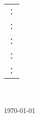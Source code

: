 \setcounter{page}{1}
\clearpage
\begin{titlepage}
\centering
\makebox[4\ccwd][s]{}
\\[40mm]
\textbf{}
\\[5mm]
\textbf{}
\\[20mm]
\begin{table}[htbp]
	\centering
	\begin{longtabu}to.45
		：\\
		：\\
		：\\
		：\\
		：\kaishu{}\\
	\end{longtabu}
\end{table}
\par
\makebox[4\ccwd][s]{}
\\[40mm]
\\
\today
\end{titlepage}
